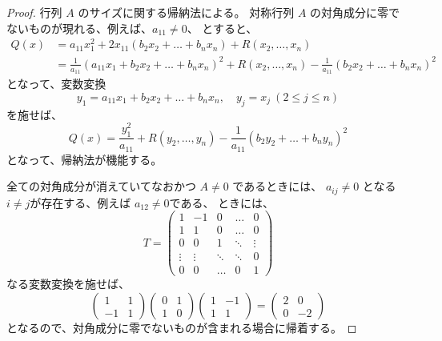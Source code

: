 \documentclass[a4paper]{jsarticle}
\theoremstyle{definition}
\theoremstyle{remark}
\begin{document}
\begin{proof}
行列 $A$ のサイズに関する帰納法による。
対称行列 $A$ の対角成分に零でないものが現れる、例えば、$a_{11} \not= 0$、
とすると、
\begin{align*}
Q(x) 
&= a_{11} x_1^2 + 2 x_{11} (b_2 x_2 + \dots + b_n x_n) + R(x_2,\dots,x_n)\\
&= \frac{1}{a_{11}} 
(a_{11}x_1 + b_2x_2 + \dots + b_n x_n)^2 
+ R(x_2,\dots, x_n) - \frac{1}{a_{11}} (b_2x_2 + \dots + b_nx_n)^2
\end{align*}
となって、変数変換
\[
y_1 = a_{11}x_1 + b_2x_2 + \dots + b_nx_n, 
\quad 
y_j = x_j\ (2 \leq j \leq n)
\]
を施せば、
\[
Q(x) = \frac{y_1^2}{a_{11}} + R(y_2,\dots,y_n) 
- \frac{1}{a_{11}} (b_2y_2 + \dots + b_ny_n)^2
\]
となって、帰納法が機能する。

全ての対角成分が消えていてなおかつ $A \not= 0$ であるときには、
$a_{ij} \not= 0$ となる $i \not= j$が存在する、例えば $a_{12} \not= 0$である、
ときには、
\[
T = 
\begin{pmatrix}
1 & -1 & 0 &\dots & 0\\
1 & 1 & 0 &\dots & 0\\
0 & 0 & 1 & \ddots & \vdots\\
\vdots & \vdots & \ddots & \ddots & 0\\
0 & 0 & \dots & 0 & 1
\end{pmatrix}
\]
なる変数変換を施せば、
\[
\begin{pmatrix}
1 & 1\\
-1 & 1
\end{pmatrix}
\begin{pmatrix}
0 & 1\\
1 & 0
\end{pmatrix}
\begin{pmatrix}
1 & -1\\
1 & 1
\end{pmatrix} 
= 
\begin{pmatrix}
2 & 0\\
0 & -2
\end{pmatrix}
\]
となるので、対角成分に零でないものが含まれる場合に帰着する。


\end{proof}
\end{document}
